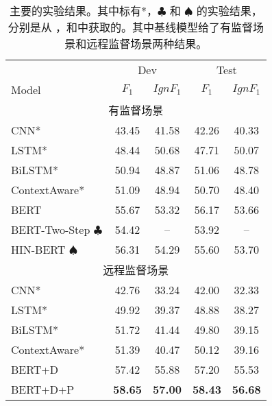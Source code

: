 \begin{table}
\centering
\begin{tabular}{lcccc}
\toprule
             & \multicolumn{2}{c}{Dev} & \multicolumn{2}{c}{Test} \\
Model        & $F_1$      & $IgnF_1$   & $F_1$      & $IgnF_1$      \\ \midrule
\multicolumn{5}{c}{有监督场景} \\ \midrule
CNN*          & 43.45      & 41.58      & 42.26      & 40.33       \\
LSTM*         & 48.44      & 50.68      & 47.71      & 50.07       \\
BiLSTM*       & 50.94      & 48.87      & 51.06      & 48.78       \\
ContextAware* & 51.09      & 48.94      & 50.70      & 48.40       \\
BERT          & 55.67      & 53.32      & 56.17      & 53.66          \\
BERT-Two-Step $\clubsuit$ & 54.42      & --         & 53.92      & --          \\
HIN-BERT $\spadesuit$      & 56.31      & 54.29      & 55.60      & 53.70       \\
\midrule
\multicolumn{5}{c}{远程监督场景} \\ \midrule
CNN*          & 42.76      & 33.24      & 42.00      & 32.33       \\
LSTM*         & 49.92      & 39.37      & 48.88      & 38.27       \\
BiLSTM*       & 51.72      & 41.44      & 49.80      & 39.15       \\
ContextAware* & 51.39      & 40.47      & 50.12      & 39.16       \\
\midrule
BERT+D        & 57.42      & 55.88      & 57.20      & 55.53       \\
BERT+D+P    & \textbf{58.65}  & \textbf{57.00}  & \textbf{58.43}  & \textbf{56.68} \\ 
\bottomrule
\end{tabular}
\caption{主要的实验结果。其中标有*，$\clubsuit$ 和 $\spadesuit$ 的实验结果，分别是从 \citet{yao2019docred}，\citet{wang2019fine}和\citet{tang2020hin}中获取的。其中基线模型给了有监督场景和远程监督场景两种结果。}
\label{main_result}
\end{table}


